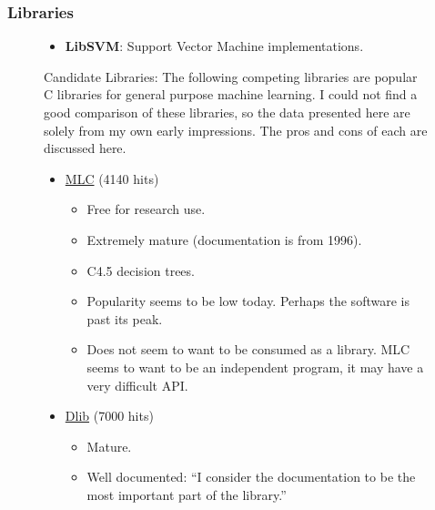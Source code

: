 \documentclass{article}
\newcommand{\CC}{C\nolinebreak\hspace{-.05em}\raisebox{.4ex}{\tiny\bf +}\nolinebreak\hspace{-.10em}\raisebox{.4ex}{\tiny\bf +}}
\newcommand*\iplus{\item[\textcolor{green}{\textbf{+}}]}
\newcommand*\iminus{\item[\textcolor{bad}{\textbf{--}}]} %
\begin{document}
\begin{multicols}{2}
\begin{itemize}
\end{itemize}

\subsubsection{Libraries}

\begin{figure}

\begin{itemize}
 
\item \textbf{LibSVM}: Support Vector Machine implementations.

\end{itemize}

Candidate Libraries: The following competing libraries are popular \CC{} libraries for general purpose machine learning.  I could not find a good comparison of these libraries, so the data presented here are solely from my own early impressions.  The pros and cons of each are discussed here.

\begin{itemize}

\item \href{http://ai.stanford.edu/~ronnyk/mlcHB.pdf}{ML\CC{}} (4140 hits)

\begin{itemize}

\iplus Free for research use.

\iplus Extremely mature (documentation is from 1996).

\iplus C4.5 decision trees.

\iminus Popularity seems to be low today.  Perhaps the software is past its peak.

\iminus Does not seem to want to be consumed as a library.  ML\CC{} seems to want to be an independent program, it may have a very difficult API.

\end{itemize}

\item \href{http://dlib.net/}{Dlib} (7000 hits)

\begin{itemize}

\iplus Mature.

\iplus Well documented: ``I consider the documentation to be the most important part of the library.''


\end{itemize}
\end{itemize}
\end{figure}
\end{multicols}
\end{document}

